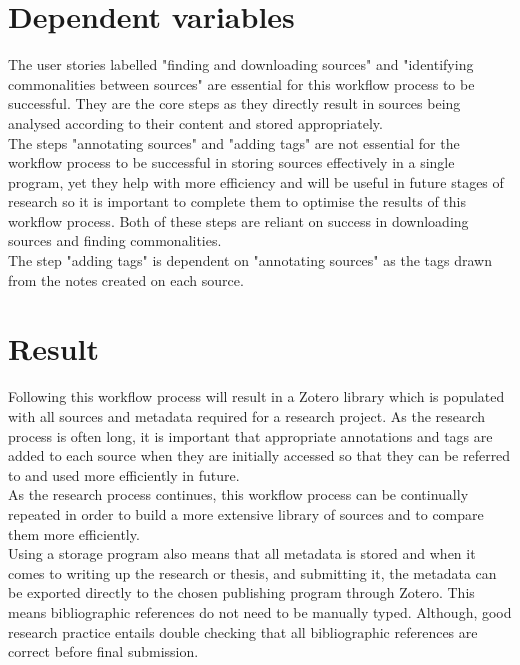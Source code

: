 \documentclass{article}
\begin{document}
\section{Dependent variables}
The user stories labelled "finding and downloading sources" and "identifying commonalities between sources" are essential for this workflow process to be successful. They are the core steps as they directly result in sources being analysed according to their content and stored appropriately.\\
The steps "annotating sources" and "adding tags" are not essential for the workflow process to be successful in storing sources effectively in a single program, yet they help with more efficiency and will be useful in future stages of research so it is important to complete them to optimise the results of this workflow process. Both of these steps are reliant on success in downloading sources and finding commonalities.\\
The step "adding tags" is dependent on "annotating sources" as the tags drawn from the notes created on each source.  

\section{Result}
Following this workflow process will result in a Zotero library which is populated with all sources and metadata required for a research project. As the research process is often long, it is important that appropriate annotations and tags are added to each source when they are initially accessed so that they can be referred to and used more efficiently in future.\\
As the research process continues, this workflow process can be continually repeated in order to build a more extensive library of sources and to compare them more efficiently.\\
Using a storage program also means that all metadata is stored and when it comes to writing up the research or thesis, and submitting it, the metadata can be exported directly to the chosen publishing program through Zotero. This means bibliographic references do not need to be manually typed. Although, good research practice entails double checking that all bibliographic references are correct before final submission.
\end{document}
